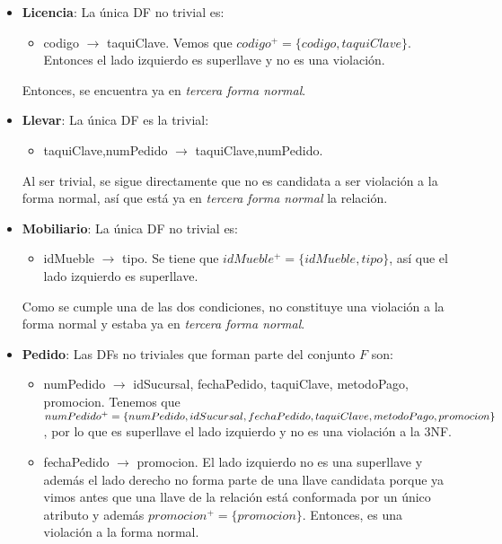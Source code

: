 \documentclass[11pt,letterpaper]{article}
\begin{document}
\begin{itemize}
\item \textbf{Licencia}: La única DF no trivial es:

\begin{itemize}
\item codigo $\rightarrow$ taquiClave. Vemos que $codigo^+=\{codigo,taquiClave\}$. Entonces el lado izquierdo es superllave y no es una violación.
\end{itemize}

Entonces, se encuentra ya en \textit{tercera forma normal}.

\item \textbf{Llevar}:  La única DF es la trivial:

\begin{itemize}
\item taquiClave,numPedido $\rightarrow$ taquiClave,numPedido.
\end{itemize}

Al ser trivial, se sigue directamente que no es candidata a ser violación a la forma normal, así que está ya en \textit{tercera forma normal} la relación. 

\item \textbf{Mobiliario}: La única DF no trivial es:


\begin{itemize}

\item idMueble $\rightarrow$ tipo. Se tiene que $idMueble^+=\{idMueble,tipo\}$, así que el lado izquierdo es superllave.
\end{itemize}

Como se cumple una de las dos condiciones, no constituye una violación a la forma normal y estaba ya en \textit{tercera forma normal}.

\item \textbf{Pedido}: Las DFs no triviales que forman parte del conjunto $F$ son:

\begin{itemize}
\item numPedido $\rightarrow$ idSucursal, fechaPedido, taquiClave, metodoPago, promocion. Tenemos que $numPedido^+=\{numPedido,idSucursal, fechaPedido,\\ taquiClave, metodoPago, promocion\}$, por lo que es superllave el lado izquierdo y no es una violación a la 3NF.
\item fechaPedido $\rightarrow$ promocion. El lado izquierdo no es una superllave y además el lado derecho no forma parte de una llave candidata porque ya vimos antes que una llave de la relación está conformada por un único atributo y además $promocion^+=\{promocion\}$. Entonces, es una violación a la forma normal.
\end{itemize}


\end{itemize}
\end{document}
